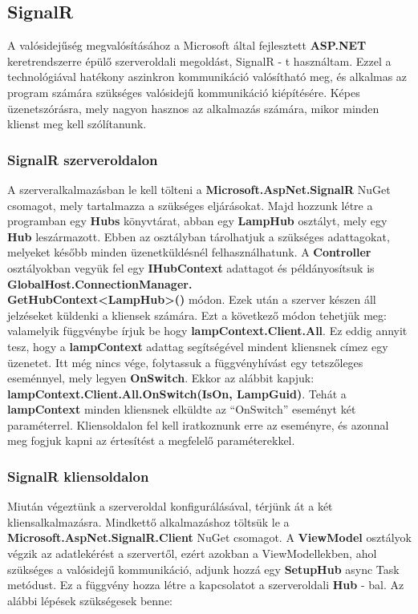 \documentclass[a4paper,12pt]{report}
\begin{document}
\subsection{SignalR}
    A valósidejűség megvalósításához a Microsoft által fejlesztett \textbf{ASP.NET} keretrendszerre épülő szerveroldali megoldást,
    SignalR - t használtam. Ezzel a technológiával hatékony aszinkron kommunikáció valósítható meg, és alkalmas az program számára
    szükséges valósidejű kommunikáció kiépítésére. Képes üzenetszórásra, mely nagyon hasznos az alkalmazás számára, mikor minden klienst
    meg kell szólítanunk.\\

\subsubsection{SignalR szerveroldalon}
    A szerveralkalmazásban le kell tölteni a \textbf{Microsoft.AspNet.SignalR} NuGet csomagot, mely tartalmazza a szükséges eljárásokat.
    Majd hozzunk létre a programban egy \textbf{Hubs} könyvtárat, abban egy \textbf{LampHub} osztályt, mely egy \textbf{Hub} leszármazott.
    Ebben az osztályban tárolhatjuk a szükséges adattagokat, melyeket később minden üzenetküldésnél felhasználhatunk. A \textbf{Controller}
    osztályokban vegyük fel egy \textbf{IHubContext} adattagot és példányosítsuk is \textbf{GlobalHost.ConnectionManager.\\GetHubContext<LampHub>()}
    módon. Ezek után a szerver készen áll jelzéseket küldenki a kliensek számára. Ezt a következő módon tehetjük meg: valamelyik függvénybe
    írjuk be hogy \textbf{lampContext.Client.All}. Ez eddig annyit tesz, hogy a \textbf{lampContext} adattag segítségével mindent kliensnek címez
    egy üzenetet. Itt még nincs vége, folytassuk a függvényhívást egy tetszőleges eseménnyel, mely legyen \textbf{OnSwitch}. Ekkor az alábbit kapjuk:
    \textbf{lampContext.Client.All.OnSwitch(IsOn, LampGuid)}. Tehát a \textbf{lampContext} minden kliensnek elküldte az ``OnSwitch'' eseményt két paraméterrel.
    Kliensoldalon fel kell iratkoznunk erre az eseményre, és azonnal meg fogjuk kapni az értesítést a megfelelő paraméterekkel.

\subsubsection{SignalR kliensoldalon}
    Miután végeztünk a szerveroldal konfigurálásával, térjünk át a két kliensalkalmazásra. Mindkettő alkalmazáshoz töltsük le a
    \textbf{Microsoft.AspNet.SignalR.Client} NuGet csomagot. A \textbf{ViewModel} osztályok végzik az adatlekérést a szervertől,
    ezért azokban a ViewModellekben, ahol szükséges a valósidejű kommunikáció, adjunk hozzá egy \textbf{SetupHub} async Task metódust.
    Ez a függvény hozza létre a kapcsolatot a szerveroldali \textbf{Hub} - bal. Az alábbi lépések szükségesek benne:
\end{document}
